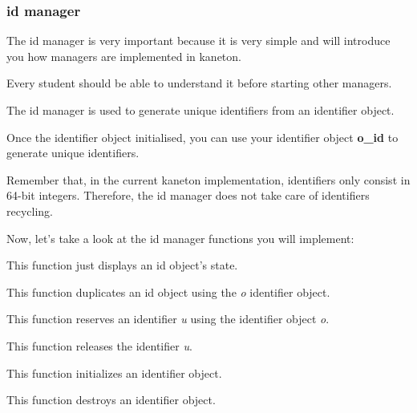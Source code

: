 %
%

\subsubsection{id manager}

The id manager is very important because it is very simple and will
introduce you how managers are implemented in kaneton.

Every student should be able to understand it before starting other
managers.

The id manager is used to generate unique identifiers from an identifier
object.

Once the identifier object initialised, you can use your
identifier object \textbf{o\_id} to generate unique identifiers.

Remember that, in the current kaneton implementation, identifiers only
consist in 64-bit integers. Therefore, the id manager does not take care
of identifiers recycling.

Now, let's take a look at the id manager functions you will implement:


This function just displays an id object's state.


This function duplicates an id object using the \textit{o} identifier
object.


This function reserves an identifier \textit{u} using the identifier
object \textit{o}.


This function releases the identifier \textit{u}.


This function initializes an identifier object.


This function destroys an identifier object.

